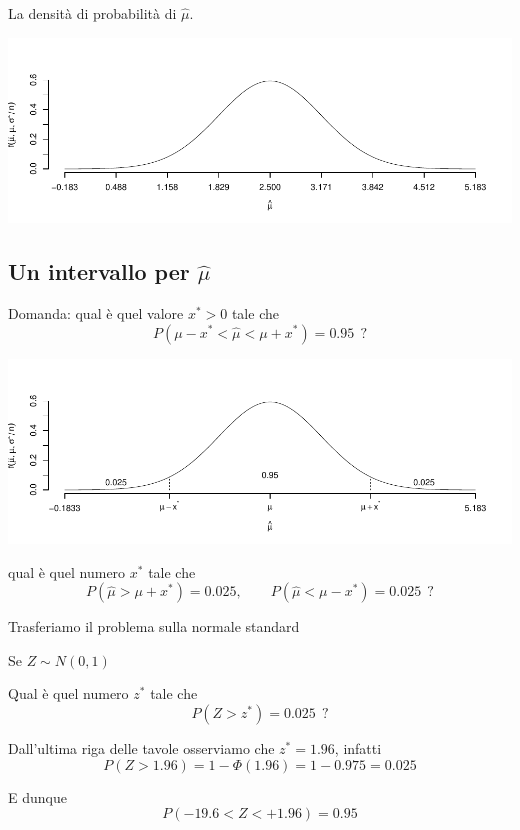 \documentclass[
  11pt,
]{book}
\theoremstyle{mytheoremstyle}
\theoremstyle{mydefstyle}
\begin{document}
La densità di probabilità di \(\hat \mu\).

\begin{center}\includegraphics{Appunti_di_Statistica_2025_files/figure-latex/13-stima-intervallare-3-1} \end{center}

\subsection{\texorpdfstring{Un intervallo per \(\hat \mu\)}{Un intervallo per \textbackslash hat \textbackslash mu}}\label{un-intervallo-per-hat-mu}

Domanda: qual è quel valore \(x^*>0\) tale che
\[P(\mu-x^*<\hat \mu<\mu+x^*)=0.95~~?\]

\begin{center}\includegraphics{Appunti_di_Statistica_2025_files/figure-latex/13-stima-intervallare-4-1} \end{center}

qual è quel numero \(x^*\) tale che
\[P(\hat \mu>\mu+x^*)=0.025,\qquad P(\hat \mu < \mu - x^*)=0.025 ~~?\]

Trasferiamo il problema sulla normale standard

Se \(Z\sim N(0,1)\)

Qual è quel numero \(z^*\) tale che
\[P(Z>z^*)=0.025 ~~?\]

Dall'ultima riga delle tavole osserviamo che \(z^*=1.96\), infatti
\[P(Z>1.96)=1- \Phi(1.96)=1-0.975=0.025 \]

E dunque
\[P(-19.6<Z<+1.96)=0.95\]
\end{document}
